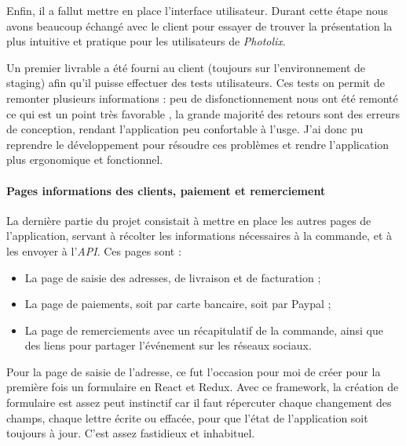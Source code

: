 \bigskip

Enfin, il a fallut mettre en place l'interface utilisateur. Durant cette
étape nous avons beaucoup échangé avec le client pour essayer de trouver
la présentation la plus intuitive et pratique pour les utilisateurs de
\emph{Photolix}.

Un premier livrable a été fourni au client (toujours sur l'environnement
de staging) afin qu'il puisse effectuer des tests utilisateurs. Ces
tests on permit de remonter plusieurs informations : peu de
disfonctionnement nous ont été remonté ce qui est un point très
favorable , la grande majorité des retours sont des erreurs de
conception, rendant l'application peu confortable à l'usge. J'ai donc pu
reprendre le développement pour résoudre ces problèmes et rendre
l'application plus ergonomique et fonctionnel.

\paragraph{Pages informations des clients, paiement et
remerciement}\label{pages-informations-des-clients-paiement-et-remerciement}

\bigskip

La dernière partie du projet consistait à mettre en place les autres
pages de l'application, servant à récolter les informations nécessaires
à la commande, et à les envoyer à l'\emph{API}. Ces pages sont :

\begin{itemize}
\tightlist
\item
  La page de saisie des adresses, de livraison et de facturation ;
\item
  La page de paiements, soit par carte bancaire, soit par Paypal ;
\item
  La page de remerciements avec un récapitulatif de la commande, ainsi
  que des liens pour partager l'événement sur les réseaux sociaux.
\end{itemize}

\bigskip

Pour la page de saisie de l'adresse, ce fut l'occasion pour moi de créer
pour la première fois un formulaire en React et Redux. Avec ce
framework, la création de formulaire est assez peut instinctif car il
faut répercuter chaque changement des champs, chaque lettre écrite ou
effacée, pour que l'état de l'application soit toujours à jour. C'est
assez fastidieux et inhabituel.

\bigskip


